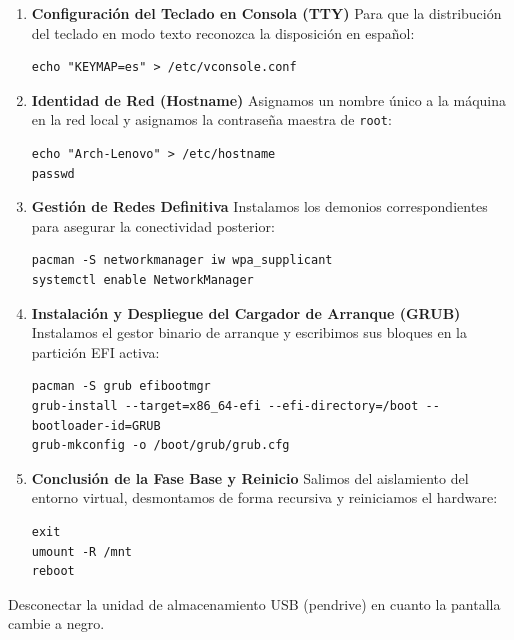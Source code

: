 \begin{enumerate}
\item [$\bullet$] \textbf{Configuración del Teclado en Consola (TTY)}
Para que la distribución del teclado en modo texto reconozca la disposición en español:
\begin{lstlisting}
echo "KEYMAP=es" > /etc/vconsole.conf
\end{lstlisting}

\item [$\bullet$] \textbf{Identidad de Red (Hostname)}
Asignamos un nombre único a la máquina en la red local y asignamos la contraseña maestra de \texttt{root}:
\begin{lstlisting}
echo "Arch-Lenovo" > /etc/hostname
passwd
\end{lstlisting}

\item [$\bullet$] \textbf{Gestión de Redes Definitiva}
Instalamos los demonios correspondientes para asegurar la conectividad posterior:
\begin{lstlisting}
pacman -S networkmanager iw wpa_supplicant
systemctl enable NetworkManager
\end{lstlisting}

\item [$\bullet$] \textbf{Instalación y Despliegue del Cargador de Arranque (GRUB)}
Instalamos el gestor binario de arranque y escribimos sus bloques en la partición EFI activa:
\begin{footnotesize}
\begin{lstlisting}
pacman -S grub efibootmgr
grub-install --target=x86_64-efi --efi-directory=/boot --bootloader-id=GRUB
grub-mkconfig -o /boot/grub/grub.cfg
\end{lstlisting}
\end{footnotesize}


\item [$\bullet$] \textbf{Conclusión de la Fase Base y Reinicio}
Salimos del aislamiento del entorno virtual, desmontamos de forma recursiva y reiniciamos el hardware:
\begin{lstlisting}
exit
umount -R /mnt
reboot
\end{lstlisting}
\end{enumerate}

\begin{nota}[]
    Desconectar la unidad de almacenamiento USB (pendrive) en cuanto la pantalla cambie a negro.
\end{nota}

\newpage

